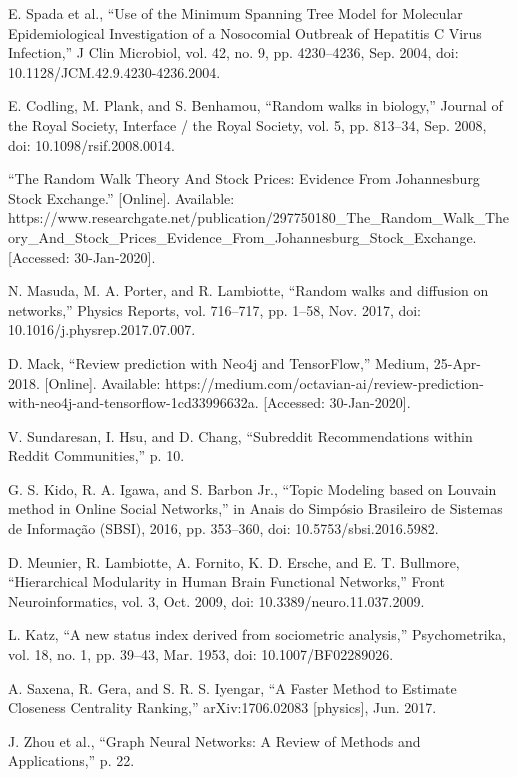 \documentclass[journal,twoside,web]{ieeecolor}
\begin{document}
\begin{thebibliography}{9}
     E. Spada et al., “Use of the Minimum Spanning Tree Model for Molecular Epidemiological Investigation of a Nosocomial Outbreak of Hepatitis C Virus Infection,” J Clin Microbiol, vol. 42, no. 9, pp. 4230–4236, Sep. 2004, doi: 10.1128/JCM.42.9.4230-4236.2004.

     E. Codling, M. Plank, and S. Benhamou, “Random walks in biology,” Journal of the Royal Society, Interface / the Royal Society, vol. 5, pp. 813–34, Sep. 2008, doi: 10.1098/rsif.2008.0014.
    
     “The Random Walk Theory And Stock Prices: Evidence From Johannesburg Stock Exchange.” [Online]. Available: https://www.researchgate.net/publication/297750180{\_}The{\_}Random{\_}Walk{\_}Theory{\_}And{\_}Stock{\_}Prices{\_}Evidence{\_}From{\_}Johannesburg{\_}Stock{\_}Exchange. [Accessed: 30-Jan-2020].

     N. Masuda, M. A. Porter, and R. Lambiotte, “Random walks and diffusion on networks,” Physics Reports, vol. 716–717, pp. 1–58, Nov. 2017, doi: 10.1016/j.physrep.2017.07.007.
    
     D. Mack, “Review prediction with Neo4j and TensorFlow,” Medium, 25-Apr-2018. [Online]. Available: https://medium.com/octavian-ai/review-prediction-with-neo4j-and-tensorflow-1cd33996632a. [Accessed: 30-Jan-2020].
    
     V. Sundaresan, I. Hsu, and D. Chang, “Subreddit Recommendations within Reddit Communities,” p. 10.

     G. S. Kido, R. A. Igawa, and S. Barbon Jr., “Topic Modeling based on Louvain method in Online Social Networks,” in Anais do Simpósio Brasileiro de Sistemas de Informação (SBSI), 2016, pp. 353–360, doi: 10.5753/sbsi.2016.5982.
    
     D. Meunier, R. Lambiotte, A. Fornito, K. D. Ersche, and E. T. Bullmore, “Hierarchical Modularity in Human Brain Functional Networks,” Front Neuroinformatics, vol. 3, Oct. 2009, doi: 10.3389/neuro.11.037.2009.
    
     L. Katz, “A new status index derived from sociometric analysis,” Psychometrika, vol. 18, no. 1, pp. 39–43, Mar. 1953, doi: 10.1007/BF02289026.
    
     A. Saxena, R. Gera, and S. R. S. Iyengar, “A Faster Method to Estimate Closeness Centrality Ranking,” arXiv:1706.02083 [physics], Jun. 2017.
    
     J. Zhou et al., “Graph Neural Networks: A Review of Methods and Applications,” p. 22.

\end{thebibliography}
\end{document}

